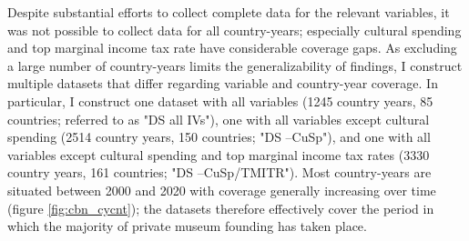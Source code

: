 \documentclass[11pt]{article}
\begin{document}
Despite substantial efforts to collect complete data for the relevant variables, it was not possible to collect data for all country-years; especially cultural spending and top marginal income tax rate have considerable coverage gaps.
As excluding a large number of country-years limits the generalizability of findings, I construct multiple datasets that differ regarding variable and country-year coverage.
In particular, I construct one dataset with all variables (1245 country years, 85 countries; referred to as "DS all IVs"), one with all variables except cultural spending (2514 country years, 150 countries; "DS --CuSp"), and one with all variables except cultural spending and top marginal income tax rates (3330 country years, 161 countries; "DS --CuSp/TMITR").
Most country-years are situated between 2000 and 2020 with coverage generally increasing over time (figure \ref{fig:cbn_cycnt}); the datasets therefore effectively cover the period in which the majority of private museum founding has taken place.
\end{document}
